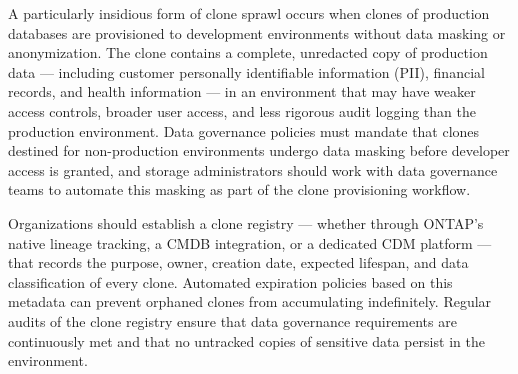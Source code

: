 \begin{securitybox}
A particularly insidious form of clone sprawl occurs when clones of production databases are provisioned to development environments without data masking or anonymization. The clone contains a complete, unredacted copy of production data --- including customer personally identifiable information (PII), financial records, and health information --- in an environment that may have weaker access controls, broader user access, and less rigorous audit logging than the production environment. Data governance policies must mandate that clones destined for non-production environments undergo data masking before developer access is granted, and storage administrators should work with data governance teams to automate this masking as part of the clone provisioning workflow.

Organizations should establish a clone registry --- whether through ONTAP's native lineage tracking, a CMDB integration, or a dedicated CDM platform --- that records the purpose, owner, creation date, expected lifespan, and data classification of every clone.
Automated expiration policies based on this metadata can prevent orphaned clones from accumulating indefinitely.
Regular audits of the clone registry ensure that data governance requirements are continuously met and that no untracked copies of sensitive data persist in the environment.

\end{securitybox}
